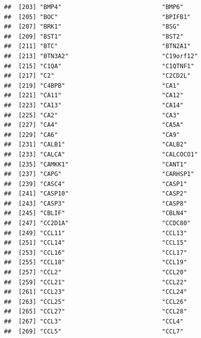 \documentclass[
]{article}
\begin{document}
\begin{verbatim}
##  [203] "BMP4"                            "BMP6"                           
##  [205] "BOC"                             "BPIFB1"                         
##  [207] "BRK1"                            "BSG"                            
##  [209] "BST1"                            "BST2"                           
##  [211] "BTC"                             "BTN2A1"                         
##  [213] "BTN3A2"                          "C19orf12"                       
##  [215] "C1QA"                            "C1QTNF1"                        
##  [217] "C2"                              "C2CD2L"                         
##  [219] "C4BPB"                           "CA1"                            
##  [221] "CA11"                            "CA12"                           
##  [223] "CA13"                            "CA14"                           
##  [225] "CA2"                             "CA3"                            
##  [227] "CA4"                             "CA5A"                           
##  [229] "CA6"                             "CA9"                            
##  [231] "CALB1"                           "CALB2"                          
##  [233] "CALCA"                           "CALCOCO1"                       
##  [235] "CAMKK1"                          "CANT1"                          
##  [237] "CAPG"                            "CARHSP1"                        
##  [239] "CASC4"                           "CASP1"                          
##  [241] "CASP10"                          "CASP2"                          
##  [243] "CASP3"                           "CASP8"                          
##  [245] "CBLIF"                           "CBLN4"                          
##  [247] "CC2D1A"                          "CCDC80"                         
##  [249] "CCL11"                           "CCL13"                          
##  [251] "CCL14"                           "CCL15"                          
##  [253] "CCL16"                           "CCL17"                          
##  [255] "CCL18"                           "CCL19"                          
##  [257] "CCL2"                            "CCL20"                          
##  [259] "CCL21"                           "CCL22"                          
##  [261] "CCL23"                           "CCL24"                          
##  [263] "CCL25"                           "CCL26"                          
##  [265] "CCL27"                           "CCL28"                          
##  [267] "CCL3"                            "CCL4"                           
##  [269] "CCL5"                            "CCL7"                           

\end{verbatim}
\end{document}
